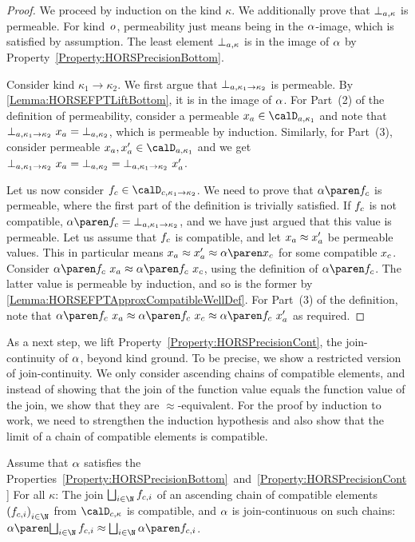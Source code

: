 \documentclass[../../diss.tex]{subfiles}
\begin{document}
\begin{proof}
    We proceed by induction on the kind $\kappa$.
    We additionally prove that $\bota{\kappa}$ is permeable.
    For kind~$o$, permeability just means being in the $\abs$-image, which is satisfied by assumption.
    The least element $\bota{\kappa}$ is in the image of $\abs$ by Property~\ref{Property:HORSPrecisionBottom}.

    Consider kind $\kappa_1 \to \kappa_2$.
    We first argue that $\bota{\kappa_1 \to \kappa_2}$ is permeable.
    By \cref{Lemma:HORSEFPTLiftBottom}, it is in the image of $\abs$.
    For Part~(2) of the definition of permeability, consider a permeable $\xa \in \domaina{\kappa_1}$ and note that $\bota{\kappa_1 \to \kappa_2} \appl \xa = \bota{\kappa_2}$, which is permeable by induction.
    Similarly, for Part~(3), consider permeable $\xa, \xa' \in \domaina{\kappa_1}$ and we get $\bota{\kappa_1 \to \kappa_2} \appl \xa = \bota{\kappa_2} = \bota{\kappa_1 \to \kappa_2} \appl \xa'$.

    Let us now consider $\fc \in \domainc{\kappa_1 \to \kappa_2}$.
    We need to prove that $\abs{\fc}$ is permeable, where the first part of the definition is trivially satisfied.
    If $f_c$ is not compatible, $\abs{\fc} = \bota{\kappa_1 \to \kappa_2}$, and we have just argued that this value is permeable.
    Let us assume that $f_c$ is compatible, and let $x_a \approx x_a'$ be permeable values.
    This in particular means $\xa \approx \xa' \approx \abs{\xc}$ for some compatible $x_c$.
    Consider $\abs{\fc} \appl \xa \approx \abs{\fc \appl \xc}$, using the definition of $\abs{\fc}$.
    The latter value is permeable by induction, and so is the former by \cref{Lemma:HORSEFPTApproxCompatibleWellDef}.
    For Part~(3) of the definition, note that $\abs{\fc} \appl \xa \approx \abs{\fc \appl \xc} \approx \abs{\fc} \appl \xa'$ as required.
\end{proof}

As a next step, we lift Property~\ref{Property:HORSPrecisionCont}, the join-continuity of $\abs$, beyond kind ground.
To be precise, we show a restricted version of join-continuity.
We only consider ascending chains of compatible elements, and instead of showing that the join of the function value equals the function value of the join, we show that they are $\approx$-equivalent.
For the proof by induction to work, we need to strengthen the induction hypothesis and also show that the limit of a chain of compatible elements is compatible.

\begin{lemma}%
\label{Lemma:HORSEFPTLiftJoinContinuity}%
    Assume that $\abs$ satisfies the Properties~\ref{Property:HORSPrecisionBottom}~and~\ref{Property:HORSPrecisionCont}
    For all $\kappa$:
    The join $\bigsqcup_{i \in \N} \fci$ of an ascending chain of compatible elements ${(\fci)}_{i \in \N}$ from $\domainc{\kappa}$ is compatible, and $\abs$ is join-continuous on such chains:
    $\abs{ \bigsqcup_{i \in \N} \fci } \approx \bigsqcup_{i \in \N} \abs{\fci}$.
\end{lemma}
\end{document}
